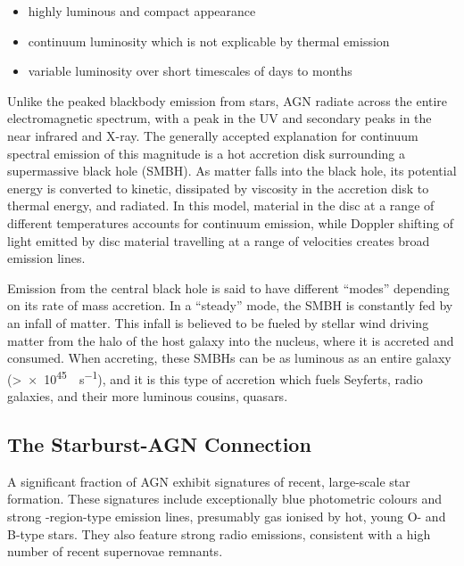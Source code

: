 \documentclass[a4paper,12pt]{article}
\begin{document}
\begin{itemize}
    \item highly luminous and compact appearance
    \item continuum luminosity which is not explicable by thermal emission
    \item variable luminosity over short timescales of days to months
\end{itemize}

Unlike the peaked blackbody emission from stars, AGN radiate across the entire
electromagnetic spectrum, with a peak in the UV and secondary peaks in the near
infrared and X-ray. The generally accepted explanation for continuum spectral
emission of this magnitude is a hot accretion disk surrounding a supermassive
black hole (SMBH).\cite{Sparke_2000} As matter falls into the black hole, its
potential energy is converted to kinetic, dissipated by viscosity in the
accretion disk to thermal energy, and radiated. In this model, material in the
disc at a range of different temperatures accounts for continuum emission,
while Doppler shifting of light emitted by disc material travelling at a range
of velocities creates broad emission lines.\cite{Peterson_1997}

Emission from the central black hole is said to have different ``modes''
depending on its rate of mass accretion. In a ``steady'' mode, the SMBH is
constantly fed by an infall of matter.\cite{Romero_Canizales_2016} This infall
is believed to be fueled by stellar wind driving matter from the halo of the
host galaxy into the nucleus, where it is accreted and consumed. When
accreting, these SMBHs can be as luminous as an entire galaxy
(\textgreater\SI{e45}{\erg\per\second}), and it is this type of accretion which
fuels Seyferts, radio galaxies, and their more luminous cousins,
quasars.\cite{Kormendy_2013, Peterson_1997}

\subsection{The Starburst-AGN Connection}\label{sec:starburst_agn_connection}

A significant fraction of AGN exhibit signatures of recent, large-scale star
formation. These signatures include exceptionally blue photometric colours and
strong -region-type emission lines, presumably gas ionised by hot,
young O- and B-type stars. They also feature strong radio emissions, consistent
with a high number of recent supernovae remnants.\cite{Peterson_1997}
\end{document}
